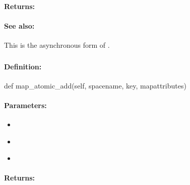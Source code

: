\paragraph{Returns:}


\paragraph{See also:}  This is the asynchronous form of .

\pagebreak
\subsubsection{}
\label{api:python:map_atomic_add}


\paragraph{Definition:}
\begin{pythoncode}
def map_atomic_add(self, spacename, key, mapattributes)
\end{pythoncode}

\paragraph{Parameters:}
\begin{itemize}[noitemsep]
\item {}\\

\item {}\\

\item {}\\

\end{itemize}

\paragraph{Returns:}


\pagebreak
\subsubsection{}
\label{api:python:async_map_atomic_add}


